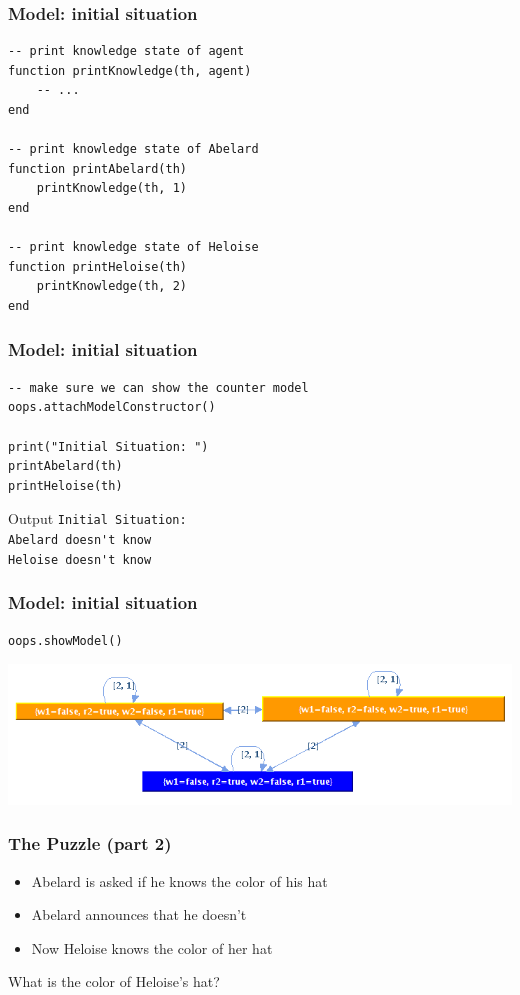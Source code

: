 \documentclass{beamer}
\begin{document}
\begin{frame}[fragile]
\frametitle{Model: initial situation}
\begin{lstlisting}
-- print knowledge state of agent
function printKnowledge(th, agent)
    -- ... 
end

-- print knowledge state of Abelard
function printAbelard(th)
    printKnowledge(th, 1)
end

-- print knowledge state of Heloise
function printHeloise(th)
    printKnowledge(th, 2)
end
\end{lstlisting}
\end{frame}

\begin{frame}[fragile]
\frametitle{Model: initial situation}
\begin{lstlisting}
-- make sure we can show the counter model
oops.attachModelConstructor()

print("Initial Situation: ")
printAbelard(th)
printHeloise(th)
\end{lstlisting}
\begin{block}{Output}
\verb!Initial Situation:! \\
\verb!Abelard doesn't know! \\
\verb!Heloise doesn't know!
\end{block}
\end{frame}

\begin{frame}[fragile]
\frametitle{Model: initial situation}
\begin{lstlisting}
oops.showModel()
\end{lstlisting}
\includegraphics[width=\textwidth]{demo04}
\end{frame}

\begin{frame}
\frametitle{The Puzzle (part 2)}
\begin{itemize}
\item Abelard is asked if he knows the color of his hat
\item Abelard announces that he doesn't
\item Now Heloise knows the color of her hat
\end{itemize}
What is the color of Heloise's hat?
\end{frame}
\end{document}
